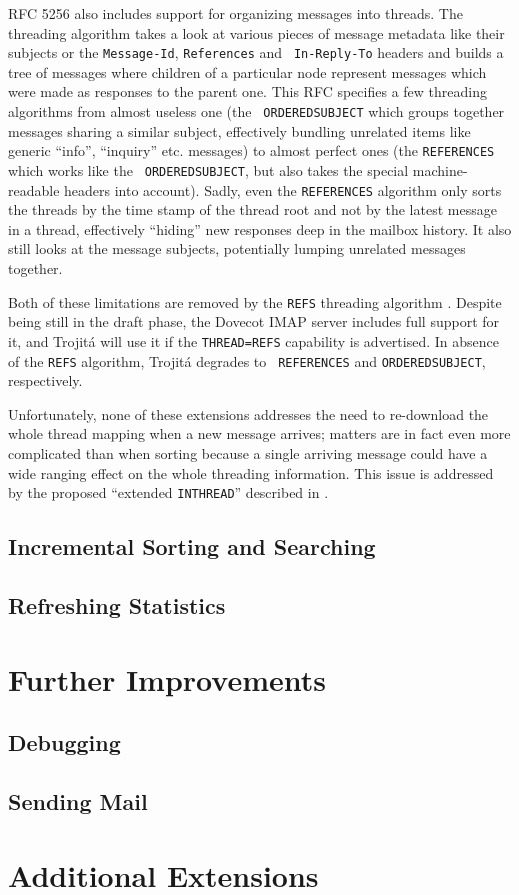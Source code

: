 \documentclass[trojita]{subfiles}
\begin{document}
RFC 5256 \cite{rfc5256} also includes support for organizing messages into threads.  The threading algorithm takes a
look at various pieces of message metadata like their subjects or the {\tt Message-Id}, {\tt References} and {\tt
In-Reply-To} headers and builds a tree of messages where children of a particular node represent messages which were
made as responses to the parent one.  This RFC specifies a few threading algorithms from almost useless one (the {\tt
ORDEREDSUBJECT} which groups together messages sharing a similar subject, effectively bundling unrelated items like
generic ``info'', ``inquiry'' etc. messages) to almost perfect ones (the {\tt REFERENCES} which works like the {\tt
ORDEREDSUBJECT}, but also takes the special machine-readable headers into account).  Sadly, even the {\tt REFERENCES}
algorithm only sorts the threads by the time stamp of the thread root and not by the latest message in a thread,
effectively ``hiding'' new responses deep in the mailbox history.  It also still looks at the message subjects,
potentially lumping unrelated messages together.

Both of these limitations are removed by the {\tt REFS} threading algorithm \cite{draft-ietf-morg-inthread}.  Despite
being still in the draft phase, the Dovecot IMAP server includes full support for it, and Trojitá will use it if the
{\tt THREAD=REFS} capability is advertised.  In absence of the {\tt REFS} algorithm, Trojitá degrades to {\tt
REFERENCES} and {\tt ORDEREDSUBJECT}, respectively.

Unfortunately, none of these extensions addresses the need to re-download the whole thread mapping when a new message
arrives; matters are in fact even more complicated than when sorting because a single arriving message could have a wide
ranging effect on the whole threading information.  This issue is addressed by the proposed ``extended {\tt INTHREAD}''
described in .

\subsection{Incremental Sorting and Searching}

\cite{rfc5267}

\subsection{Refreshing Statistics}

\cite{rfc5465}

\section{Further Improvements}

\subsection{Debugging}

\subsection{Sending Mail}


\section{Additional Extensions}
\end{document}
